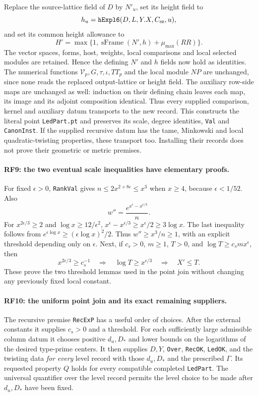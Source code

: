 \documentclass[11pt,a4paper]{article}
\numberwithin{equation}{section}
\theoremstyle{remark}\newtheorem{remark}[theorem]{Remark}
\begin{document}
Replace the source-lattice field of $D$ by $N'_u$, set its height field to
\[
 h_u=\texttt{hExpl6}(D,L,Y.X,C_{\rm sz},u),
\]
and set its common height allowance to
\[
                  H'=\max\{1,\operatorname{sFrame}(N',h)
                                      +\mu_{\max}(RR)\}.       \tag{RF.21}
\]
The vector spaces, forms, host, weights, local comparisons and local
selected modules are retained. Hence the defining $N'$ and $h$ fields
now hold as identities. The numerical functions $\mathcal V_p,G,\tau,
\iota,TT_p$ and the local module $NP$ are unchanged, since none reads the
replaced output-lattice or height field. The auxiliary row-side maps are
unchanged as well: induction on their defining chain leaves each map,
its image and its adjoint composition identical. Thus every supplied
comparison, kernel and auxiliary datum transports to the new record.
This constructs the literal point \texttt{LedPart.pt} and preserves
its scale, degree identities, \texttt{Val} and \texttt{CanonInst}.
If the supplied recursive datum has the tame, Minkowski and local
quadratic-twisting properties, these transport too. Installing their
records does not prove their geometric or metric premises.

\paragraph{RF9: the two eventual scale inequalities have elementary proofs.}
For fixed $\epsilon>0$, \texttt{RankVal} gives
$n\leq2x^{2+8\epsilon}\leq x^3$ when $x\geq4$, because
$\epsilon<1/52$. Also
\[
                         w''=\frac{e^{x^\epsilon-x^{\epsilon/3}}}{n}.
\]
For $x^{2\epsilon/3}\geq2$ and $\log x\geq12/\epsilon^2$,
$x^\epsilon-x^{\epsilon/3}\geq x^\epsilon/2\geq3\log x$.
The last inequality follows from
$e^{\epsilon\log x}\geq(\epsilon\log x)^2/2$.
Thus $w''\geq x^3/n\geq1$, with an explicit threshold depending only
on $\epsilon$.
Next, if $c_s>0$, $m\geq1$, $T>0$, and
$\log T\geq c_smx^\epsilon$, then
\[
 x^{2\epsilon/3}\geq c_s^{-1}
       \quad\Longrightarrow\quad \log T\geq x^{\epsilon/3}
       \quad\Longrightarrow\quad X'\leq T.                   \tag{RF.22}
\]
These prove the two threshold lemmas used in the point join without
changing any previously fixed local constant.

\paragraph{RF10: the uniform point join and its exact remaining suppliers.}
The recursive premise \texttt{RecExP} has a useful order of choices.
After the external constants it supplies $c_s>0$ and a threshold.
For each sufficiently large admissible column datum it chooses positive
$d_u,D_*$ and lower bounds on the logarithms of the desired type-prime
centers. It then supplies $D,Y$, \texttt{Over}, \texttt{RecOK},
\texttt{LedOK}, and the twisting data \emph{for every} level record
with those $d_u,D_*$ and the prescribed $\Gamma$. Its requested property
$Q$ holds for every compatible completed \texttt{LedPart}.
The universal quantifier over the level record permits the level choice
to be made after $d_u,D_*$ have been fixed.
\end{document}
